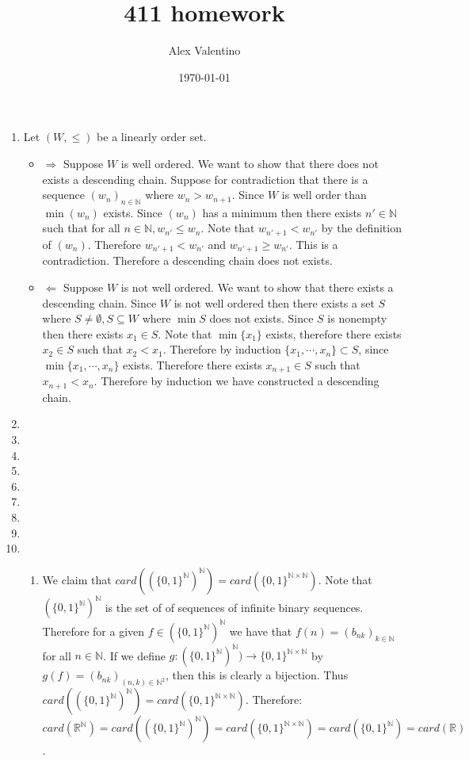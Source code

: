 \documentclass[12pt, letterpaper]{article}
\date{\today}
\author{Alex Valentino}
\title{411 homework}
\newcommand{\N}{\mathbb{N}}
\newcommand{\R}{\mathbb{R}}
\begin{document}
\begin{enumerate}
	\item Let $(W,\leq)$ be a linearly order set.  
	\begin{itemize}
		\item  $\Rightarrow$ Suppose $W$ is well ordered.  We want to show that there does not 
		exists a descending chain.  Suppose for contradiction that there is a sequence $(w_n)_{n \in \N}$ where $w_n > w_{n+1}$.  Since $W$ is well order than 
		$\min (w_n)$ exists.  Since $(w_n)$ has a minimum then there exists 
		$n' \in \N$ such that for all $n \in \N, w_{n'} \leq w_n$.  Note that 
		$w_{n'+1} < w_{n'}$ by the definition of $(w_n)$.  Therefore $w_{n'+1} < w_{n'}$ and $w_{n'+1} \geq w_{n'}$.  This is a contradiction.  Therefore a descending chain does not exists.  
		\item $\Leftarrow$ Suppose $W$ is not well ordered.  We want to show that there exists 
		a descending chain.  Since $W$ is not well ordered then there exists a set
		$S$ where $S \neq \emptyset, S \subseteq W$ where $\min S$ does not exists.  Since $S$ is nonempty then there exists $x_1 \in S$.  Note that $\min \{x_1\}$ exists, therefore there exists $x_2 \in S$ such that $x_2 < x_1$.  Therefore by induction $\{x_1,\cdots,x_n\} \subset S$, since $\min \{x_1,\cdots,x_n\}$ exists.  Therefore there exists $x_{n+1} \in S$ such that $x_{n+1} < x_n$.  Therefore by induction we have constructed a descending chain.  
	\end{itemize}
	\item 
	\item 
	\item 
	\item 
	\item 
	\item 
	\item 
	\item 
	\item
	\begin{enumerate}
		\item We claim that $card((\{0,1\}^\N)^\N) = card(\{0,1\}^{\N\times \N})$.
		Note that $(\{0,1\}^\N)^\N$ is the set of of sequences of infinite binary sequences.  Therefore for a given $f \in (\{0,1\}^\N)^\N$ we have that $f(n) = (b_{nk})_{ k\in \N}$ for all $n \in \N$.  If we define $g:(\{0,1\}^\N)^\N) \to \{0,1\}^{\N\times \N}$ by $g(f) = (b_{nk})_{(n,k) \in \N^2}$, then this is clearly a bijection.  Thus $card((\{0,1\}^\N)^\N) = card(\{0,1\}^{\N\times \N})$.
		Therefore: $$card(\R^\N) = card((\{0,1\}^\N)^\N) = card(\{0,1\}^{\N\times \N}) = card(\{0,1\}^{\N}) = card(\R)$$.    

\end{enumerate}
\end{enumerate}
\end{document}
